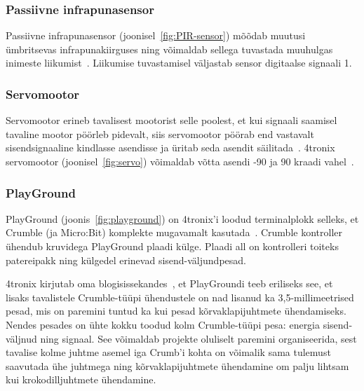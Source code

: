 \documentclass[12pt]{article}
\begin{document}
\subsubsection{Passiivne infrapunasensor}


Passiivne infrapunasensor (joonisel~\ref{fig:PIR-sensor}) mõõdab muutusi ümbritsevas infrapunakiirguses ning võimaldab sellega tuvastada muuhulgas inimeste liikumist~\cite{PIRSensorCrumbDigitalInputforCrumbleController}. Liikumise tuvastamisel väljastab sensor digitaalse signaali 1.

\subsubsection{Servomootor} \label{servo}


Servomootor erineb tavalisest mootorist selle poolest, et kui signaali saamisel tavaline mootor pöörleb pidevalt, siis servomootor pöörab end vastavalt sisendsignaaline kindlasse asendisse ja üritab seda asendit säilitada~\cite{Servomootorroboticlab}. 4tronix servomootor (joonisel~\ref{fig:servo}) võimaldab võtta asendi -90 ja 90 kraadi vahel~\cite{ServoCrumbforCrumbleController}.

\subsubsection{PlayGround} \label{playground}

PlayGround (joonis~\ref{fig:playground}) on 4tronix’i loodud terminalplokk selleks, et Crumble (ja Micro:Bit) komplekte mugavamalt kasutada~\cite{PlaygroundforCrumbleBlog}. Crumble kontroller ühendub kruvidega PlayGround plaadi külge. Plaadi all on kontrolleri toiteks patereipakk ning külgedel erinevad sisend-väljundpesad.


4tronix kirjutab oma blogisissekandes~\cite{PlaygroundforCrumbleBlog}, et PlayGroundi teeb eriliseks see, et lisaks tavalistele Crumble-tüüpi ühendustele on nad lisanud ka 3,5-millimeetrised pesad, mis on paremini tuntud ka kui pesad kõrvaklapijuhtmete ühendamiseks. Nendes pesades on ühte kokku toodud kolm Crumble-tüüpi pesa: energia sisend-väljnud ning signaal. See võimaldab projekte oluliselt paremini organiseerida, sest tavalise kolme juhtme asemel iga Crumb’i kohta on võimalik sama tulemust saavutada ühe juhtmega ning kõrvaklapijuhtmete ühendamine om palju lihtsam kui krokodilljuhtmete ühendamine. 
\end{document}

